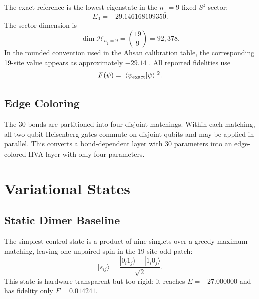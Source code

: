 \documentclass[11pt]{article}
\newcommand{\exactE}{-29.146168109350}
\begin{document}
The exact reference is the lowest eigenstate in the $n_\downarrow=9$ fixed-$S^z$ sector:
\[
E_0 = \exactE.
\]
The sector dimension is
\[
\dim\mathcal{H}_{n_\downarrow=9} = \binom{19}{9}=92{,}378.
\]
In the rounded convention used in the Ahsan calibration table, the corresponding 19-site value appears as approximately $-29.14$ \cite{ahsan2026}.
All reported fidelities use
\begin{equation}
F(\psi)=|\langle \psi_{\rm exact}|\psi\rangle|^2.
\end{equation}

\subsection{Edge Coloring}

The 30 bonds are partitioned into four disjoint matchings.  Within each matching, all two-qubit Heisenberg gates commute on disjoint qubits and may be applied in parallel.  This converts a bond-dependent layer with 30 parameters into an edge-colored HVA layer with only four parameters.

\begin{table}[H]
\centering
\caption{Four-color edge grouping used by the HVA.  Bonds inside each group are disjoint.}
\label{tab:edge_coloring}
\end{table}

\section{Variational States}

\subsection{Static Dimer Baseline}

The simplest control state is a product of nine singlets over a greedy maximum matching, leaving one unpaired spin in the 19-site odd patch:
\[
|s_{ij}\rangle = \frac{|0_i1_j\rangle-|1_i0_j\rangle}{\sqrt{2}}.
\]
This state is hardware transparent but too rigid: it reaches $E=-27.000000$ and has fidelity only $F=0.014241$.
\end{document}
